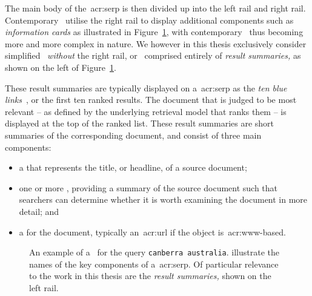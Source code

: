 The main body of the~\gls{acr:serp} is then divided up into the left rail and right rail. Contemporary~ utilise the right rail to display additional components such as \emph{information cards} as illustrated in Figure~\ref{fig:serp_example}, with contemporary~ thus becoming more and more complex in nature. We however in this thesis exclusively consider simplified~ \emph{without} the right rail, or~ comprised entirely of \emph{result summaries,} as shown on the left of Figure~\ref{fig:serp_example}.

These result summaries are typically displayed on a~\gls{acr:serp} as the \emph{ten blue links}~\citep{hearst2009_search}, or the first ten ranked results. The document that is judged to be most relevant -- as defined by the underlying retrieval model that ranks them -- is displayed at the top of the ranked list. These result summaries are short summaries of the corresponding document, and consist of three main components:

\begin{itemize}
    \item{a  that represents the title, or headline, of a source document;}
    \item{one or more , providing a summary of the source document such that searchers can determine whether it is worth examining the document in more detail; and}
    \item{a  for the document, typically an~\gls{acr:url} if the object is~\gls{acr:www}-based.}
\end{itemize}

\begin{figure}[t!]
    \centering
    \caption[Example illustration of a~\gls{acr:serp} and its constituent components]{An example of a~ for the query \texttt{canberra australia}.  illustrate the names of the key components of a~\gls{acr:serp}. Of particular relevance to the work in this thesis are the \emph{result summaries,} shown on the left rail.}
    \label{fig:serp_example}
\end{figure}


